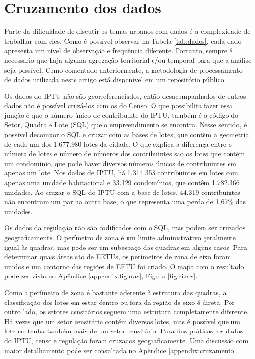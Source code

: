 \clearpage
\section{Cruzamento dos dados}
\label{sec:dadosCruz}

Parte da dificuldade de discutir os temas urbanos com dados é a complexidade de trabalhar com eles. Como é possível observar na Tabela \ref{tab:dados}, cada dado apresenta um nível de observação e frequência diferente. Portanto, sempre é necessário que haja alguma agregação territorial e/ou temporal para que a análise seja possível. Como comentado anteriormente, a metodologia de processamento de dados utilizada neste artigo está disponível em um repositório público.



Os dados do IPTU não são georreferenciados, então desacompanhados de outros dados não é possível cruzá-los com os do Censo. O que possibilita fazer essa junção é que o número único de contribuinte do IPTU, também é o código do Setor, Quadra e Lote (SQL) que o empreendimento se encontra. Nesse sentido, é possível decompor o SQL e cruzar com as bases de lotes, que contêm a geometria de cada  um dos 1.677.980 lotes da cidade. O que explica a diferença entre o número de lotes e número de números dos contribuintes são os lotes que contém um condomínio, que pode haver diversos números únicos de contribuintes em apenas um lote. Nos dados de IPTU, há 1.314.353 contribuintes em lotes com apenas uma unidade habitacional e 33.129 condomínios, que contêm 1.782.366 unidades. Ao cruzar o SQL do IPTU com a base de lotes, 44.319 contribuintes não encontram um par na outra base, o que representa uma perda de 1,67\% das unidades. 

Os dados da regulação não são codificados com o SQL, mas podem ser cruzados geograficamente. O perímetro de zona é um limite administrativo geralmente igual às quadras, mas pode ser um subespaço das quadras em alguns casos. Para determinar quais áreas são de EETUs, os perímetros de zona de eixo foram unidos e um contorno das regiões de EETU foi criado. O mapa com o resultado pode ser visto no Apêndice \ref{appendix:figuras}, Figura \ref{fig:eixos}. 

Como o perímetro de zona é bastante aderente à estrutura das quadras, a classificação dos lotes em estar dentro ou fora da região de eixo é direta. Por outro lado, os setores censitários seguem uma estrutura completamente diferente. Há vezes que um setor censitário contém diversos lotes, mas é possível que um lote contenha também mais de um setor censitário. Para fins práticos, os dados do IPTU, censo e regulação foram cruzados geograficamente. Uma discussão com maior detalhamento pode ser consultada no Apêndice \ref{appendix:cruzamento}.

